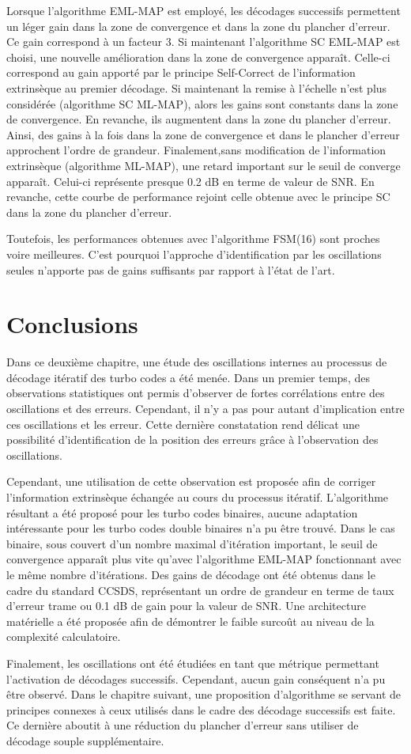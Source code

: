 Lorsque l'algorithme EML-MAP est employé, les décodages successifs permettent un léger gain dans la zone de convergence 
et dans la zone du plancher d'erreur. Ce gain correspond à un facteur 3. Si maintenant l'algorithme SC EML-MAP 
est  choisi, une nouvelle amélioration dans la zone de convergence apparaît. Celle-ci correspond au gain apporté par le 
principe Self-Correct de l'information extrinsèque au premier décodage. Si maintenant la remise à l'échelle n'est plus 
considérée (algorithme SC ML-MAP), alors les gains sont constants dans la zone de convergence. En revanche, ils augmentent dans 
la zone du plancher d'erreur. Ainsi, des gains à la fois dans la zone de convergence et dans le plancher d'erreur 
approchent l'ordre de grandeur. Finalement,sans modification de l'information extrinsèque 
(algorithme ML-MAP), une retard important sur le seuil de converge apparaît. Celui-ci représente presque 0.2 dB en terme 
de valeur de SNR. En revanche, cette courbe de performance rejoint celle obtenue avec le principe SC dans la zone du 
plancher d'erreur. 

Toutefois, les performances obtenues avec l'algorithme FSM(16) sont proches voire meilleures. C'est pourquoi l'approche 
d'identification par les oscillations seules n'apporte pas de gains suffisants par rapport à l'état de l'art.

\section{Conclusions}
Dans ce deuxième chapitre, une étude des oscillations internes au processus de décodage itératif des turbo codes a été 
menée. Dans un premier temps, des observations statistiques ont permis d'observer de fortes corrélations entre des oscillations
et des erreurs. Cependant, il n'y a pas pour autant d'implication entre ces oscillations et les erreur. Cette dernière constatation 
rend délicat une possibilité d'identification de la position des erreurs grâce à l'observation des oscillations.

Cependant, une utilisation de cette observation est proposée afin de corriger l'information extrinsèque échangée au 
cours du processus itératif. L'algorithme résultant a été proposé pour les turbo codes binaires, aucune adaptation intéressante 
pour les turbo codes double binaires n'a pu être trouvé. Dans le cas binaire, sous couvert d'un nombre maximal d'itération
important, le seuil de convergence apparaît plus vite qu'avec l'algorithme EML-MAP fonctionnant avec le même nombre 
d'itérations. Des gains de décodage ont été obtenus dans le cadre du standard CCSDS, représentant un ordre de grandeur en terme de taux d'erreur trame 
ou 0.1 dB de gain pour la valeur de SNR. Une architecture matérielle a été proposée afin de démontrer le faible surcoût au niveau de la complexité
calculatoire.

Finalement, les oscillations ont été étudiées en tant que métrique permettant l'activation de décodages successifs. 
Cependant, aucun gain conséquent n'a pu être observé. Dans le chapitre suivant, une proposition d'algorithme se servant de 
 principes connexes à ceux utilisés dans le cadre des décodage successifs est faite. Ce dernière aboutit à une réduction
du plancher d'erreur sans utiliser de décodage souple supplémentaire.